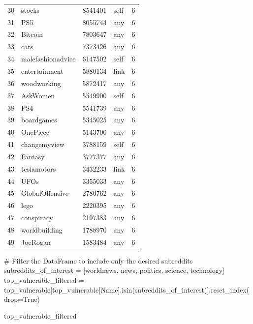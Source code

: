 \documentclass[
  12pt,
  letterpaper,
  DIV=11,
  numbers=noendperiod]{scrartcl}
\newenvironment{Shaded}{\begin{snugshade}}{\end{snugshade}}
\newcommand{\CommentTok}[1]{\textcolor[rgb]{0.37,0.37,0.37}{#1}}
\newcommand{\NormalTok}[1]{\textcolor[rgb]{0.00,0.23,0.31}{#1}}
\newcommand{\OperatorTok}[1]{\textcolor[rgb]{0.37,0.37,0.37}{#1}}
\newcommand{\StringTok}[1]{\textcolor[rgb]{0.13,0.47,0.30}{#1}}
\newcommand{\VariableTok}[1]{\textcolor[rgb]{0.07,0.07,0.07}{#1}}
\begin{document}
\begin{longtable}[]{@{}lllll@{}}
30 & stocks & 8541401 & self & 6 \\
31 & PS5 & 8055744 & any & 6 \\
32 & Bitcoin & 7803647 & any & 6 \\
33 & cars & 7373426 & any & 6 \\
34 & malefashionadvice & 6147502 & self & 6 \\
35 & entertainment & 5880134 & link & 6 \\
36 & woodworking & 5872417 & any & 6 \\
37 & AskWomen & 5549900 & self & 6 \\
38 & PS4 & 5541739 & any & 6 \\
39 & boardgames & 5345025 & any & 6 \\
40 & OnePiece & 5143700 & any & 6 \\
41 & changemyview & 3788159 & self & 6 \\
42 & Fantasy & 3777377 & any & 6 \\
43 & teslamotors & 3432233 & link & 6 \\
44 & UFOs & 3355033 & any & 6 \\
45 & GlobalOffensive & 2780762 & any & 6 \\
46 & lego & 2220395 & any & 6 \\
47 & conspiracy & 2197383 & any & 6 \\
48 & worldbuilding & 1788970 & any & 6 \\
49 & JoeRogan & 1583484 & any & 6 \\
\end{longtable}

\begin{Shaded}
\begin{Highlighting}[]
\CommentTok{\# Filter the DataFrame to include only the desired subreddits}
\NormalTok{subreddits\_of\_interest }\OperatorTok{=}\NormalTok{ [}\StringTok{\textquotesingle{}worldnews\textquotesingle{}}\NormalTok{, }\StringTok{\textquotesingle{}news\textquotesingle{}}\NormalTok{, }\StringTok{\textquotesingle{}politics\textquotesingle{}}\NormalTok{, }\StringTok{\textquotesingle{}science\textquotesingle{}}\NormalTok{, }\StringTok{\textquotesingle{}technology\textquotesingle{}}\NormalTok{]}
\NormalTok{top\_vulnerable\_filtered }\OperatorTok{=}\NormalTok{ top\_vulnerable[top\_vulnerable[}\StringTok{\textquotesingle{}Name\textquotesingle{}}\NormalTok{].isin(subreddits\_of\_interest)].reset\_index(drop}\OperatorTok{=}\VariableTok{True}\NormalTok{)}

\NormalTok{top\_vulnerable\_filtered}
\end{Highlighting}
\end{Shaded}
\end{document}
